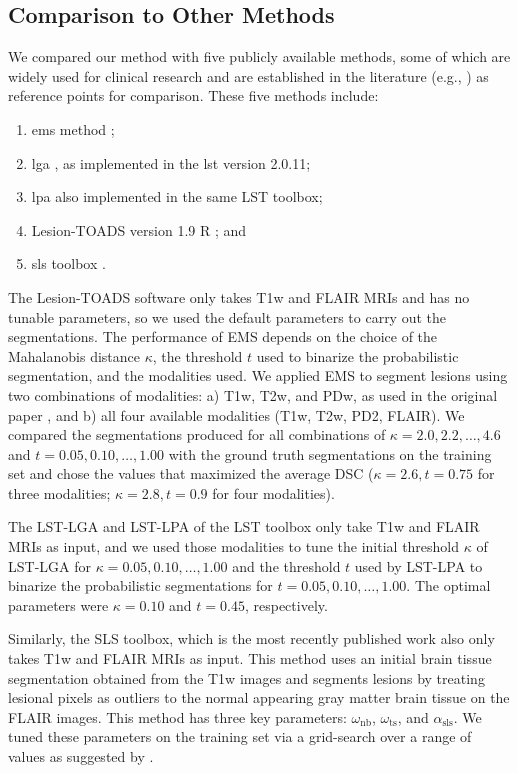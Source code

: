 \subsection[Comparison to other methods]{Comparison to Other Methods}
\label{sec:othermethods}

We compared our method with five publicly available methods, some of which
are widely used for clinical research and are established in the literature
(e.g., \citealp{sudre2015,subbanna2015,guizard2015}) as reference points for
comparison. These five methods include:
\begin{enumerate}
\item \Gls{ems} method \citep{vanleemput2001};
\item \Gls{lga} \citep{schmidt2012}, as
implemented in the \gls{lst} version 2.0.11;
\item \Gls{lpa} also implemented in the same LST toolbox;
\item Lesion-TOADS version 1.9 R \citep{shiee2010}; and 
\item \Gls{sls} toolbox \citep{roura2015}.
\end{enumerate}
The Lesion-TOADS software only takes T1w and FLAIR MRIs and has no tunable
parameters, so we used the default parameters to carry out the segmentations.
The performance of EMS depends on the choice of the Mahalanobis distance
$\kappa$, the threshold $t$ used to binarize the probabilistic segmentation, and
the modalities used. We applied EMS to segment lesions using two combinations of
modalities: a) T1w, T2w, and PDw, as used in the original paper
\citep{vanleemput2001}, and b) all four available modalities (T1w, T2w, PD2,
FLAIR). We compared the segmentations produced for all combinations of $\kappa =
2.0, 2.2, \dotsc, 4.6$ and $t = 0.05, 0.10, \dotsc, 1.00$ with the ground truth
segmentations on the training set and chose the values that maximized the
average DSC ($\kappa = 2.6, t = 0.75$ for three modalities; $\kappa = 2.8, t =
0.9$ for four modalities).

The LST-LGA and LST-LPA of the LST toolbox only take T1w and FLAIR MRIs as
input, and we used those modalities to tune the initial threshold $\kappa$ of
LST-LGA for $\kappa = 0.05, 0.10, \dotsc, 1.00$ and the threshold $t$ used by
LST-LPA to binarize the probabilistic segmentations for $t = 0.05, 0.10, \dotsc,
1.00$. The optimal parameters were $\kappa = 0.10$ and $t = 0.45$, respectively.

Similarly, the SLS toolbox, which is the most recently published work
\citep{roura2015} also only takes T1w and FLAIR MRIs as input. This method uses
an initial brain tissue segmentation obtained from the T1w images and segments
lesions by treating lesional pixels as outliers to the normal appearing gray
matter brain tissue on the FLAIR images. This method has three key parameters:
$\omega_\text{nb}$, $\omega_\text{ts}$, and $\alpha_\text{sls}$. We tuned these
parameters on the training set via a grid-search over a range of values as
suggested by \citet{roura2015}.

